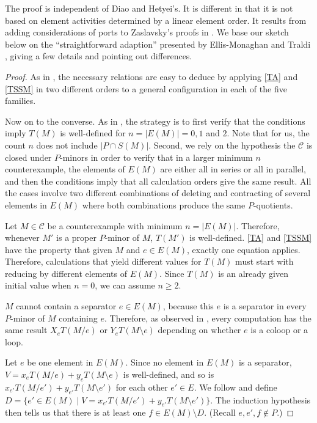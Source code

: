 \documentclass[12pt,leqno]{amsart}
\theoremstyle{remark}
\newcommand{\Card}[1]{\ensuremath{{\left|#1\right|}}}
\begin{document}
The proof is independent of Diao and Hetyei's.  It is different in
that it is not based on element activities determined by a linear element
order.  
It results from adding considerations of ports to 
Zaslavsky's proofs in \cite{MR93a:05047}.  We base our sketch 
below on the ``straightforward adaption'' presented by
Ellis-Monaghan and Traldi \cite{Ellis-Monaghan-Traldi}, giving
a few details and pointing out differences.

\begin{proof}
As in \cite{Ellis-Monaghan-Traldi}, 
the necessary relations are easy to deduce by 
applying \eqref{TA} and \eqref{TSSM} in two different
orders to a general configuration in each of the five families.

Now on to the converse.
As in \cite{Ellis-Monaghan-Traldi}, the strategy
is to first verify
that the conditions imply $T(M)$ is well-defined for 
$n = \Card{E(M)} = 0, 1$ and $2$.  Note that
for us, the count $n$ does not include $|P\cap S(M)|$.
Second, we rely on the hypothesis the $\mathcal{C}$ is closed under
$P$-minors in order to verify
that in a larger minimum $n$ counterexample, the elements of
$E(M)$ are either all in series or all in parallel, 
and then the conditions
imply that all calculation orders give the same result.  All the cases involve
two different combinations of deleting and contracting of several elements
in $E(M)$ where both combinations produce the same $P$-quotients.

Let $M\in\mathcal{C}$ be a counterexample with minimum $n=|E(M)|$.
Therefore, whenever $M'$ is a proper $P$-minor of $M$,
$T(M')$ is well-defined.  \eqref{TA} and \eqref{TSSM}
have the property that given $M$ and $e\in E(M)$, exactly one equation
applies.  Therefore, 
calculations that yield different values for $T(M)$ must start with
reducing by different elements of $E(M)$.  Since $T(M)$ is an already given 
initial value when $n=0$, 
we can assume $n\geq 2$.

$M$ cannot contain a separator $e\in E(M)$, because
this $e$ is a separator in every $P$-minor of $M$ containing $e$.
Therefore, as observed in \cite{Ellis-Monaghan-Traldi}, every
computation has the same result $X_e T(M/e)$ or $Y_e T(M\setminus e)$ 
depending on whether $e$ is a coloop or a loop.

Let $e$ be one element in $E(M)$.  Since no element in $E(M)$ is a 
separator, $V=x_{e} T(M/{e}) + y_{e} T(M\setminus {e})$ is well-defined, 
and so is $x_{e'} T(M/{e'}) + y_{e'} T(M\setminus {e'})$ 
for each other $e'\in E$.
We follow \cite{Ellis-Monaghan-Traldi} and define
$D=\{e'\in E(M) \mid V=x_{e'} T(M/{e'}) + y_{e'} T(M\setminus {e'})\}$.  The 
induction
hypothesis then tells us 
that there is at least 
one  $f\in E(M)\setminus D$.  
(Recall $e, e', f\not\in P$.)


\end{proof}
\end{document}
